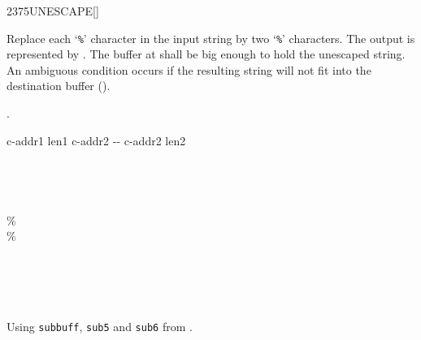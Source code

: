 \begin{worddef}{2375}{UNESCAPE}[]%
\item {}

	Replace each `\texttt{\%}' character in the input string
	 by two `\texttt{\%}' characters.  The output
	is represented by .  The buffer at 
	shall be big enough to hold the unescaped string.  An ambiguous
	condition occurs if the resulting string will not fit into the
	destination buffer ().

\see {}.

	\begin{implement} %
		\word{:}   c-addr1 len1 c-addr2 -{}- c-addr2 len2 \\
		  \\
		  \\
		  \\
		\tab {}    \word{+}   \\
		\tab[2]   \word{[CHAR]} \% \word{=}  \\
		\tab[3] \word{[CHAR]} \%    \\
		\tab[2]  \\
		\tab[2]      \\
		\tab {} \\
		\tab {} \word{-} \\
		\word{;}
	\end{implement}

	\begin{testing} %
		Using \texttt{subbuff}, \texttt{sub5} and \texttt{sub6} from .

	\end{testing}
\end{worddef}
\endinput
